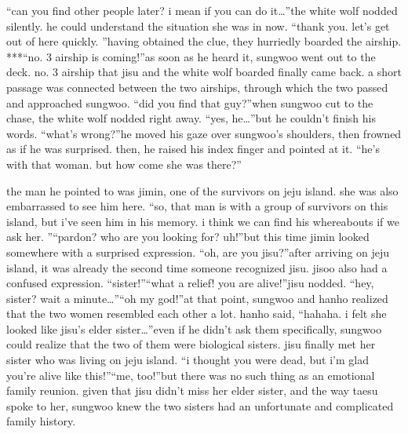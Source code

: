 “can you find other people later? i mean if you can do it…”the white wolf nodded silently.
 he could understand the situation she was in now.
“thank you.
 let’s get out of here quickly.
”having obtained the clue, they hurriedly boarded the airship.
***“no.
 3 airship is coming!”as soon as he heard it, sungwoo went out to the deck.
 no.
 3 airship that jisu and the white wolf boarded finally came back.
a short passage was connected between the two airships, through which the two passed and approached sungwoo.
“did you find that guy?”when sungwoo cut to the chase, the white wolf nodded right away.
“yes, he…”but he couldn’t finish his words.
“what’s wrong?”he moved his gaze over sungwoo’s shoulders, then frowned as if he was surprised.
then, he raised his index finger and pointed at it.
“he’s with that woman.
 but how come she was there?”

the man he pointed to was jimin, one of the survivors on jeju island.
 she was also embarrassed to see him here.
“so, that man is with a group of survivors on this island, but i’ve seen him in his memory.
 i think we can find his whereabouts if we ask her.
”“pardon? who are you looking for? uh!”but this time jimin looked somewhere with a surprised expression.
“oh, are you jisu?”after arriving on jeju island, it was already the second time someone recognized jisu.
jisoo also had a confused expression.
“sister!”“what a relief! you are alive!”jisu nodded.
“hey, sister? wait a minute…”“oh my god!”at that point, sungwoo and hanho realized that the two women resembled each other a lot.
hanho said, “hahaha.
 i felt she looked like jisu’s elder sister…”even if he didn’t ask them specifically, sungwoo could realize that the two of them were biological sisters.
 jisu finally met her sister who was living on jeju island.
“i thought you were dead, but i’m glad you’re alive like this!”“me, too!”but there was no such thing as an emotional family reunion.
 given that jisu didn’t miss her elder sister, and the way taesu spoke to her, sungwoo knew the two sisters had an unfortunate and complicated family history.


 